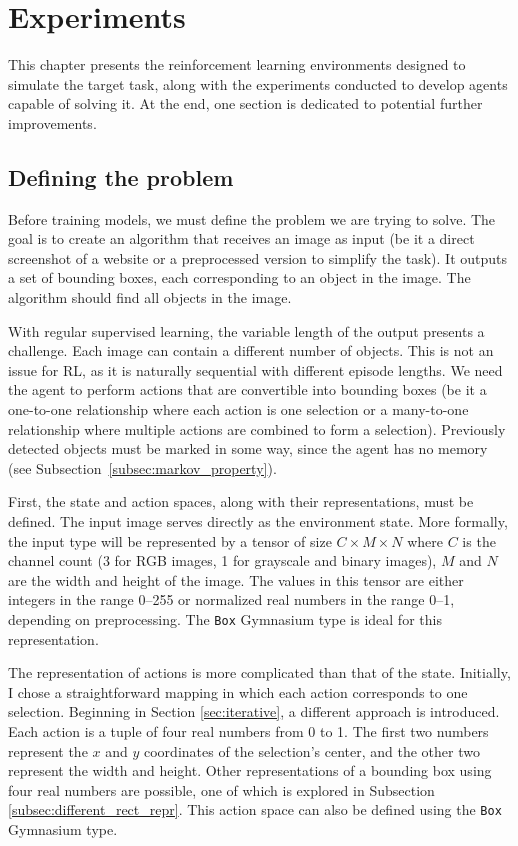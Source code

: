 \documentclass[
  digital,     %
  oneside,     %
  nosansbold,  %
  nocolorbold, %
  lof,         %
  lot,         %
]{fithesis4}
\begin{document}
\chapter{Experiments}
\label{ch:experiments}

This chapter presents the reinforcement learning environments designed to simulate the target task, along with the experiments conducted to develop agents capable of solving it. At the end, one section is dedicated to potential further improvements.

\section{Defining the problem}
\label{sec:problem_definition}

Before training models, we must define the problem we are trying to solve. The goal is to create an algorithm that receives an image as input (be it a direct screenshot of a website or a preprocessed version to simplify the task). It outputs a set of bounding boxes, each corresponding to an object in the image. The algorithm should find all objects in the image.

With regular supervised learning, the variable length of the output presents a challenge. Each image can contain a different number of objects. This is not an issue for RL, as it is naturally sequential with different episode lengths. We need the agent to perform actions that are convertible into bounding boxes (be it a one-to-one relationship where each action is one selection or a many-to-one relationship where multiple actions are combined to form a selection). Previously detected objects must be marked in some way, since the agent has no memory (see Subsection~\ref{subsec:markov_property}).

First, the state and action spaces, along with their representations, must be defined. The input image serves directly as the environment state. More formally, the input type will be represented by a tensor of size $C\times M \times N$ where $C$ is the channel count (3 for RGB images, 1 for grayscale and binary images), $M$ and $N$ are the width and height of the image. The values in this tensor are either integers in the range 0--255 or normalized real numbers in the range 0--1, depending on preprocessing. The \texttt{Box} Gymnasium type is ideal for this representation.

The representation of actions is more complicated than that of the state. Initially, I chose a straightforward mapping in which each action corresponds to one selection. Beginning in Section \ref{sec:iterative}, a different approach is introduced. Each action is a tuple of four real numbers from 0 to 1. The first two numbers represent the $x$ and $y$ coordinates of the selection's center, and the other two represent the width and height. Other representations of a bounding box using four real numbers are possible, one of which is explored in Subsection \ref{subsec:different_rect_repr}. This action space can also be defined using the \texttt{Box} Gymnasium type.
\end{document}

